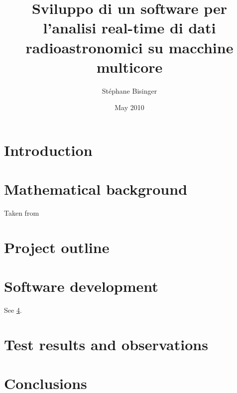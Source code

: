 \documentclass[a4paper,11pt,twoside,openright]{unibo}
\begin{document}
\title{Sviluppo di un software per l'analisi real-time di dati
radioastronomici su macchine multicore}
\author{St\'ephane Bisinger}
\date{May 2010}

\maketitle
%

\tableofcontents

\chapter*{Introduction}
\label{intro}
\chapter{Mathematical background}
\label{math_bkg}
Taken from \cite{bertoni}
\chapter{Project outline}
\label{outline}
\chapter{Software development}
\label{sw_devel}
See \ref{tests}.
\chapter{Test results and observations}
\label{tests}
\chapter{Conclusions}
\label{conclusions}


\end{document}

